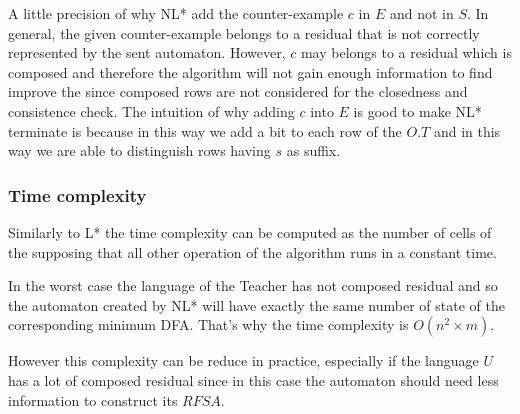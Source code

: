A little precision of why NL* add the counter-example $c$ in $E$ and not in $S$. In general, the given counter-example belongs to a residual that is not correctly represented by the sent automaton. However, $c$ may belongs to a residual which is composed and therefore the algorithm will not gain enough information to find improve the \OT since composed rows are not considered for the closedness and consistence check. The intuition of why adding $c$ into $E$ is good to make NL* terminate is because in this way we add a bit to each row of the $O.T$ and in this way we are able to distinguish rows having $s$ as suffix.


\subsubsection{Time complexity}
Similarly to L* the time complexity can be computed as the number of cells of the \OT supposing that all other operation of the algorithm runs in a constant time.

In the worst case the language of the Teacher has not composed residual and so the automaton created by NL* will have exactly the same number of state of the corresponding minimum DFA. That's why the time complexity is $O(n^2 \times m)$.

However this complexity can be reduce in practice, especially if the language $U$ has a lot of composed residual since in this case the automaton should need less information to construct its $RFSA$.